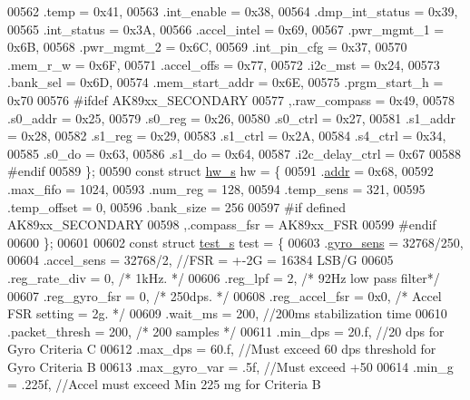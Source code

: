 \begin{DoxyCode}
{00562     .temp           = 0x41,
00563     .int\_enable     = 0x38,
00564     .dmp\_int\_status = 0x39,
00565     .int\_status     = 0x3A,
00566     .accel\_intel    = 0x69,
00567     .pwr\_mgmt\_1     = 0x6B,
00568     .pwr\_mgmt\_2     = 0x6C,
00569     .int\_pin\_cfg    = 0x37,
00570     .mem\_r\_w        = 0x6F,
00571     .accel\_offs     = 0x77,
00572     .i2c\_mst        = 0x24,
00573     .bank\_sel       = 0x6D,
00574     .mem\_start\_addr = 0x6E,
00575     .prgm\_start\_h   = 0x70
00576 \textcolor{preprocessor}{#ifdef AK89xx\_SECONDARY}
00577     ,.raw\_compass   = 0x49,
00578     .s0\_addr        = 0x25,
00579     .s0\_reg         = 0x26,
00580     .s0\_ctrl        = 0x27,
00581     .s1\_addr        = 0x28,
00582     .s1\_reg         = 0x29,
00583     .s1\_ctrl        = 0x2A,
00584     .s4\_ctrl        = 0x34,
00585     .s0\_do          = 0x63,
00586     .s1\_do          = 0x64,
00587     .i2c\_delay\_ctrl = 0x67
00588 \textcolor{preprocessor}{#endif}
00589 \};
00590 \textcolor{keyword}{const} \textcolor{keyword}{struct }\hyperlink{structhw__s}{hw\_s} hw = \{
00591     .\hyperlink{structhw__s_a4c34a946600e9d68b6355d23f54d291b}{addr}           = 0x68,
00592     .max\_fifo       = 1024,
00593     .num\_reg        = 128,
00594     .temp\_sens      = 321,
00595     .temp\_offset    = 0,
00596     .bank\_size      = 256
00597 \textcolor{preprocessor}{#if defined AK89xx\_SECONDARY}
00598     ,.compass\_fsr    = AK89xx\_FSR
00599 \textcolor{preprocessor}{#endif}
00600 \};
00601 
00602 \textcolor{keyword}{const} \textcolor{keyword}{struct }\hyperlink{structtest__s}{test\_s} test = \{
00603     .\hyperlink{structtest__s_a32da1174cf6569aa99bdff70055bb45a}{gyro\_sens}      = 32768/250,
00604     .accel\_sens     = 32768/2,  \textcolor{comment}{//FSR = +-2G = 16384 LSB/G}
00605     .reg\_rate\_div   = 0,    \textcolor{comment}{/* 1kHz. */}
00606     .reg\_lpf        = 2,    \textcolor{comment}{/* 92Hz low pass filter*/}
00607     .reg\_gyro\_fsr   = 0,    \textcolor{comment}{/* 250dps. */}
00608     .reg\_accel\_fsr  = 0x0,  \textcolor{comment}{/* Accel FSR setting = 2g. */}
00609     .wait\_ms        = 200,   \textcolor{comment}{//200ms stabilization time}
00610     .packet\_thresh  = 200,    \textcolor{comment}{/* 200 samples */}
00611     .min\_dps        = 20.f,  \textcolor{comment}{//20 dps for Gyro Criteria C}
00612     .max\_dps        = 60.f, \textcolor{comment}{//Must exceed 60 dps threshold for Gyro Criteria B}
00613     .max\_gyro\_var   = .5f, \textcolor{comment}{//Must exceed +50%
00614     .min\_g          = .225f, \textcolor{comment}{//Accel must exceed Min 225 mg for Criteria B}
}}
\end{DoxyCode}
